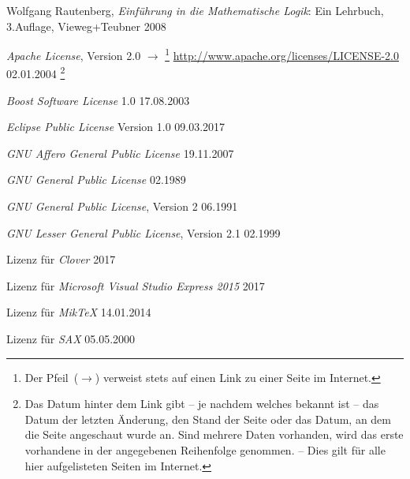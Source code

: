 \begin{flushleft}
	\begin{thebibliography}{12}
		\likechapter[section]{\bibname}  %
		\label{dic:Literaturverzeichnis} %

		Wolfgang Rautenberg,
		\emph{Einführung in die Mathematische Logik}:
		Ein Lehrbuch, 3.\@ Auflage, Vieweg+Teubner 2008

		\emph{Apache License}, Version 2.0
		$\rightarrow$%
		\footnote{%
			Der Pfeil~($\rightarrow$) verweist stets auf einen Link zu einer Seite im Internet.
		}
		\url{http://www.apache.org/licenses/LICENSE-2.0}
		02.01.2004%
		\footnote{%
			Das Datum hinter dem Link gibt -- je nachdem welches bekannt ist -- das Datum der letzten Änderung, den Stand der Seite oder das Datum, an dem die Seite angeschaut wurde an.
			Sind mehrere Daten vorhanden, wird das erste vorhandene in der angegebenen Reihenfolge genommen.
			-- Dies gilt für alle hier aufgelisteten Seiten im Internet.
		}

		\emph{Boost Software License} 1.0
		17.08.2003

		\emph{Eclipse Public License} Version 1.0
		09.03.2017

		\emph{GNU Affero General Public License}
		19.11.2007

		\emph{GNU General Public License}
		02.1989

		\emph{GNU General Public License}, Version 2
		06.1991

		\emph{GNU Lesser General Public License},
		Version 2.1
		02.1999

		Lizenz für \emph{Clover}
		2017

		Lizenz
		für \emph{Microsoft Visual Studio Express 2015}
		2017

		Lizenz für \emph{MikTeX}
		14.01.2014

		Lizenz für \emph{SAX}
		05.05.2000


\end{thebibliography}
\end{flushleft}
